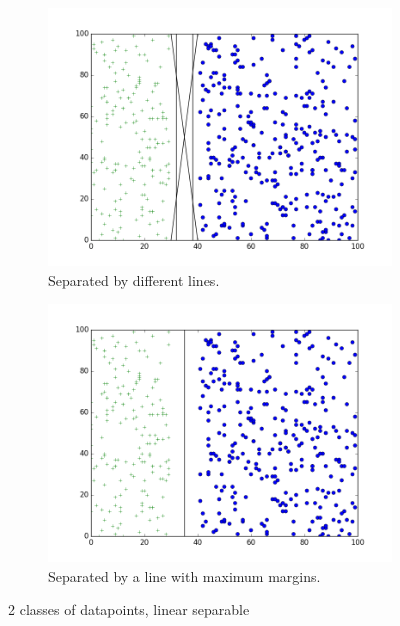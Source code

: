 \begin{figure}
\begin{subfigure}[t]{0.5\linewidth}
\centering
\includegraphics[width=\linewidth]{images/svm_lin}
\caption{Separated by different lines.}
\label{fig:svm_lin:hyp}
\end{subfigure}%
%
\begin{subfigure}[t]{0.5\linewidth}
\centering
\includegraphics[width=\linewidth]{images/svm_lin_maxmarg}
\caption{Separated by a line with maximum margins.}
\label{fig:svm_lin:maxmarg}
\end{subfigure}
\caption{2 classes of datapoints, linear separable}
\label{fig:svm_lin}
\end{figure}

